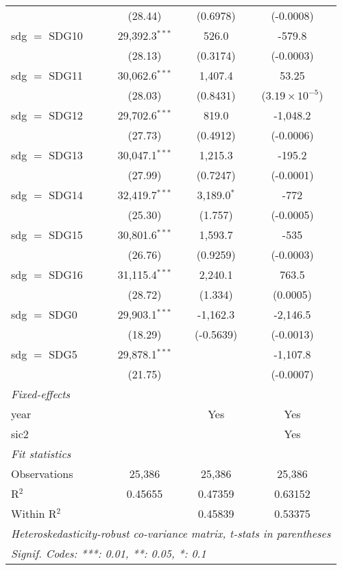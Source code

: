 \begin{tabular}{lccc}
                 & (28.44)          & (0.6978)       & (-0.0008)\\   
   sdg $=$ SDG10 & 29,392.3$^{***}$ & 526.0          & -579.8\\   
                 & (28.13)          & (0.3174)       & (-0.0003)\\   
   sdg $=$ SDG11 & 30,062.6$^{***}$ & 1,407.4        & 53.25\\   
                 & (28.03)          & (0.8431)       & ($3.19\times 10^{-5}$)\\    
   sdg $=$ SDG12 & 29,702.6$^{***}$ & 819.0          & -1,048.2\\   
                 & (27.73)          & (0.4912)       & (-0.0006)\\   
   sdg $=$ SDG13 & 30,047.1$^{***}$ & 1,215.3        & -195.2\\   
                 & (27.99)          & (0.7247)       & (-0.0001)\\   
   sdg $=$ SDG14 & 32,419.7$^{***}$ & 3,189.0$^{*}$  & -772\\   
                 & (25.30)          & (1.757)        & (-0.0005)\\   
   sdg $=$ SDG15 & 30,801.6$^{***}$ & 1,593.7        & -535\\   
                 & (26.76)          & (0.9259)       & (-0.0003)\\   
   sdg $=$ SDG16 & 31,115.4$^{***}$ & 2,240.1        & 763.5\\   
                 & (28.72)          & (1.334)        & (0.0005)\\   
   sdg $=$ SDG0  & 29,903.1$^{***}$ & -1,162.3       & -2,146.5\\   
                 & (18.29)          & (-0.5639)      & (-0.0013)\\   
   sdg $=$ SDG5  & 29,878.1$^{***}$ &                & -1,107.8\\   
                 & (21.75)          &                & (-0.0007)\\   
   \midrule
   \emph{Fixed-effects}\\
   year          &                  & Yes            & Yes\\  
   sic2          &                  &                & Yes\\  
   \midrule
   \emph{Fit statistics}\\
   Observations  & 25,386           & 25,386         & 25,386\\  
   R$^2$         & 0.45655          & 0.47359        & 0.63152\\  
   Within R$^2$  &                  & 0.45839        & 0.53375\\  
   \midrule \midrule
   \multicolumn{4}{l}{\emph{Heteroskedasticity-robust co-variance matrix, t-stats in parentheses}}\\
   \multicolumn{4}{l}{\emph{Signif. Codes: ***: 0.01, **: 0.05, *: 0.1}}\\
\end{tabular}
\par\endgroup


